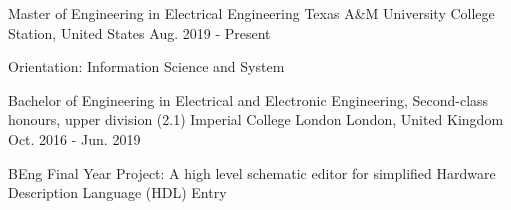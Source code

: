 
\begin{cventries}
\cventry
    {Master of Engineering in Electrical Engineering} %
    {Texas A\&M University} %
    {College Station, United States} %
    {Aug. 2019 - Present} %
    {
      \begin{cvitems} %
         \item {Orientation: Information Science and System}
      \end{cvitems}
    }
  \cventry
    {Bachelor of Engineering in Electrical and Electronic Engineering, Second-class honours, upper division (2.1)} %
    {Imperial College London} %
    {London, United Kingdom} %
    {Oct. 2016 - Jun. 2019} %
    {
      \begin{cvitems} %
         \item {BEng Final Year Project: A high level schematic editor for simplified Hardware Description Language (HDL) Entry}
      \end{cvitems}
    }
\end{cventries}
